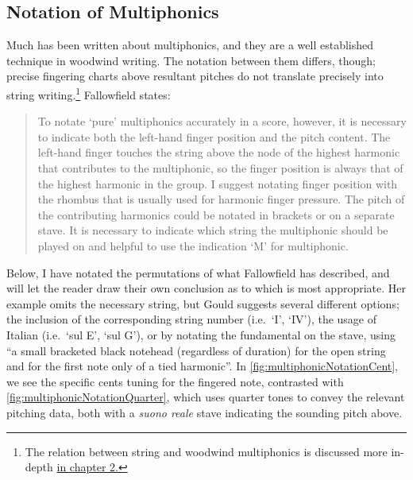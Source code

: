 \subsection{Notation of Multiphonics}\label{sec:notation-multiphonics}
Much has been written about multiphonics, and they are a well established technique in woodwind writing.
The notation between them differs, though; precise fingering charts above resultant pitches do not translate precisely into string writing.\footnote{The relation between string and woodwind multiphonics is discussed more in-depth \hyperref[sec:multiphonicsWoodwind]{in chapter 2.}}
Fallowfield states: \begin{quotation}
    To notate ‘pure’ multiphonics accurately in a score, however, it is necessary to indicate both the left-hand finger position and the pitch content. 
    The left-hand finger touches the string above the node of the highest harmonic that contributes to the multiphonic, so the finger position is always that of the highest harmonic in the group. 
    I suggest notating finger position with the rhombus that is usually used for harmonic finger pressure. 
    The pitch of the contributing harmonics could be notated in brackets or on a separate stave.
    It is necessary to indicate which string the multiphonic should be played on and helpful to use the indication ‘M’ for multiphonic.\autocite[http://www.cellomap.com/index/the-string/multiphonics-and-other-multiple-sounds.html]{fallowfieldCelloMap}
\end{quotation}
Below, I have notated the permutations of what Fallowfield has described, and will let the reader draw their own conclusion as to which is most appropriate.
Her example omits the necessary string, but Gould suggests several different options; the inclusion of the corresponding string number (i.e.\ `I', `IV'), the usage of Italian (i.e.\ `sul E', `sul G'), or by notating the fundamental on the stave, using ``a small bracketed black notehead (regardless of duration) for the open string and for the first note only of a tied harmonic''.\autocite[418]{gouldBars2011}
In \autoref{fig:multiphonicNotationCent}, we see the specific cents tuning for the fingered note, contrasted with \autoref{fig:multiphonicNotationQuarter}, which uses quarter tones to convey the relevant pitching data, both with a \emph{suono reale} stave indicating the sounding pitch above.

